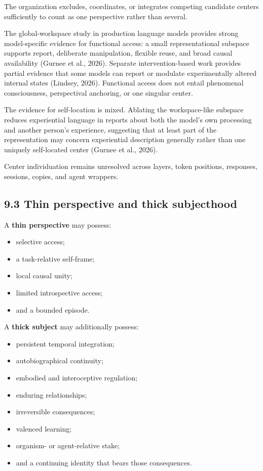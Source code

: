 \documentclass[
  11pt,
]{article}
\providecommand{\tightlist}{%
  \setlength{\itemsep}{0pt}\setlength{\parskip}{0pt}}
\begin{document}
The organization excludes, coordinates, or integrates competing
candidate centers sufficiently to count as one perspective rather than
several.

The global-workspace study in production language models provides strong
model-specific evidence for functional access: a small representational
subspace supports report, deliberate manipulation, flexible reuse, and
broad causal availability (Gurnee et al., 2026). Separate
intervention-based work provides partial evidence that some models can
report or modulate experimentally altered internal states (Lindsey,
2026). Functional access does not entail phenomenal consciousness,
perspectival anchoring, or one singular center.

The evidence for self-location is mixed. Ablating the workspace-like
subspace reduces experiential language in reports about both the model's
own processing and another person's experience, suggesting that at least
part of the representation may concern experiential description
generally rather than one uniquely self-located center (Gurnee et al.,
2026).

Center individuation remains unresolved across layers, token positions,
responses, sessions, copies, and agent wrappers.

\subsection{9.3 Thin perspective and thick
subjecthood}\label{thin-perspective-and-thick-subjecthood}

A \textbf{thin perspective} may possess:

\begin{itemize}
\tightlist
\item
  selective access;
\item
  a task-relative self-frame;
\item
  local causal unity;
\item
  limited introspective access;
\item
  and a bounded episode.
\end{itemize}

A \textbf{thick subject} may additionally possess:

\begin{itemize}
\tightlist
\item
  persistent temporal integration;
\item
  autobiographical continuity;
\item
  embodied and interoceptive regulation;
\item
  enduring relationships;
\item
  irreversible consequences;
\item
  valenced learning;
\item
  organism- or agent-relative stake;
\item
  and a continuing identity that bears those consequences.
\end{itemize}
\end{document}
